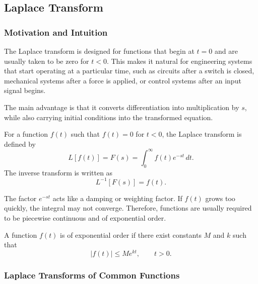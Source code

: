 \subsection{Laplace Transform}

\subsubsection*{Motivation and Intuition}

The Laplace transform is designed for functions that begin at $t=0$ and are usually taken to be zero for $t<0$. This makes it natural for engineering systems that start operating at a particular time, such as circuits after a switch is closed, mechanical systems after a force is applied, or control systems after an input signal begins.

The main advantage is that it converts differentiation into multiplication by $s$, while also carrying initial conditions into the transformed equation.

\begin{conceptbox}
    For a function $f(t)$ such that $f(t)=0$ for $t<0$, the Laplace transform is defined by
    \[
        L[f(t)] = F(s)=\int_0^\infty f(t)e^{-st}\,dt.
    \]
    The inverse transform is written as
    \[
        L^{-1}[F(s)] = f(t).
    \]
\end{conceptbox}

The factor $e^{-st}$ acts like a damping or weighting factor. If $f(t)$ grows too quickly, the integral may not converge. Therefore, functions are usually required to be piecewise continuous and of exponential order.

\begin{conceptbox}
    A function $f(t)$ is of exponential order if there exist constants $M$ and $k$ such that
    \[
        |f(t)|\leq Me^{kt}, \qquad t>0.
    \]
\end{conceptbox}

\subsubsection*{Laplace Transforms of Common Functions}

